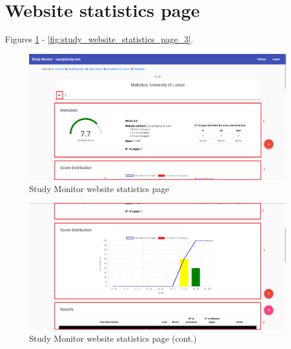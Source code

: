 \section{Website statistics page}

Figures \ref{fig:study_website_statistics_page} - \ref{fig:study_website_statistics_page_3}.

\begin{figure}[H]
    \centering
    \includegraphics[width=\linewidth]{lib/images/study/study_website_statistics_page.png}
    \caption{Study Monitor website statistics page}
    \label{fig:study_website_statistics_page}
\end{figure}

\clearpage

\begin{figure}[H]
    \centering
    \includegraphics[width=\linewidth]{lib/images/study/study_website_statistics_page_2.png}
    \caption{Study Monitor website statistics page (cont.)}
    \label{fig:study_website_statistics_page_2}
\end{figure}

